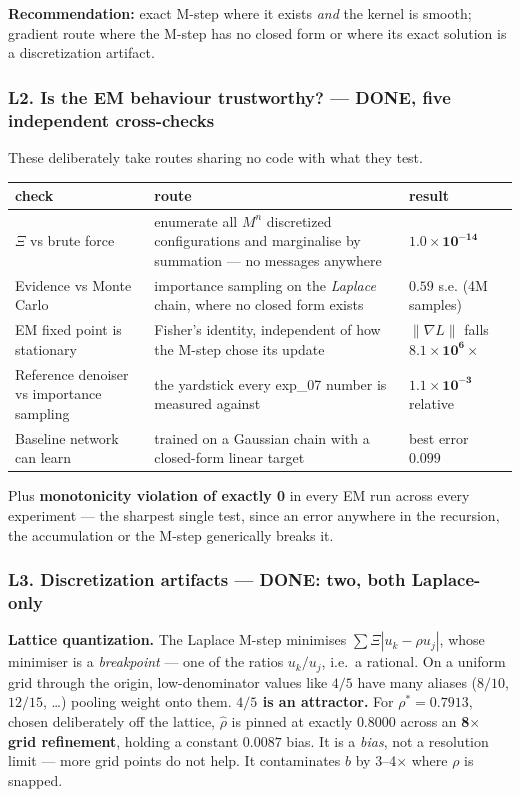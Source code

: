 \documentclass[11pt,a4paper]{article}
\newcommand{\done}{\textcolor{GoodGreen}{\textbf{DONE}}}
\begin{document}
\noindent
\textbf{Recommendation:} exact M-step where it exists \emph{and} the kernel is smooth;
gradient route where the M-step has no closed form or where its exact solution is a
discretization artifact.

\subsubsection*{L2. Is the EM behaviour trustworthy? --- \done, five independent cross-checks}

These deliberately take routes sharing no code with what they test.

\begin{center}
\small
\begin{tabular}{@{}p{5.4cm}p{6.0cm}p{3.4cm}@{}}
\toprule
\textbf{check} & \textbf{route} & \textbf{result} \\
\midrule
$\Xi$ vs brute force & enumerate all $M^n$ discretized configurations and marginalise by
summation --- no messages anywhere & $\mathbf{1.0\times10^{-14}}$ \\
Evidence vs Monte Carlo & importance sampling on the \emph{Laplace} chain, where no closed
form exists & $\mathbf{0.59}$ s.e. (4M samples) \\
EM fixed point is stationary & Fisher's identity, independent of how the M-step chose its
update & $\|\nabla L\|$ falls $\mathbf{8.1\times10^{6}}\times$ \\
Reference denoiser vs importance sampling & the yardstick every exp\_07 number is measured
against & $\mathbf{1.1\times10^{-3}}$ relative \\
Baseline network can learn & trained on a Gaussian chain with a closed-form linear target &
best error $\mathbf{0.099}$ \\
\bottomrule
\end{tabular}
\end{center}

\noindent
Plus \textbf{monotonicity violation of exactly 0} in every EM run across every experiment ---
the sharpest single test, since an error anywhere in the recursion, the accumulation or the
M-step generically breaks it.

\subsubsection*{L3. Discretization artifacts --- \done: two, both Laplace-only}

\textbf{Lattice quantization.} The Laplace M-step minimises $\sum \Xi|u_k - \rho u_j|$, whose
minimiser is a \emph{breakpoint} --- one of the ratios $u_k/u_j$, i.e.\ a rational. On a
uniform grid through the origin, low-denominator values like $4/5$ have many aliases
($8/10$, $12/15$, \dots) pooling weight onto them. \textbf{$4/5$ is an attractor.} For
$\rho^*=0.7913$, chosen deliberately off the lattice, $\hat\rho$ is pinned at exactly
$0.8000$ across an \textbf{8$\times$ grid refinement}, holding a constant $0.0087$ bias. It
is a \emph{bias}, not a resolution limit --- more grid points do not help. It contaminates
$b$ by 3--4$\times$ where $\rho$ is snapped.
\end{document}
